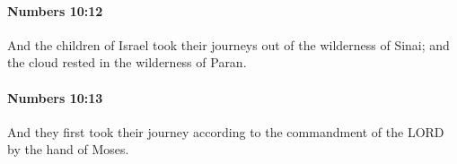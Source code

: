 		\paragraph{Numbers 10:12} %
			\label{NUMBERS-10-12}

			And the children of Israel took their journeys out of the wilderness of Sinai; and the cloud rested in the wilderness of Paran.


		\paragraph{Numbers 10:13} %
			\label{NUMBERS-10-13}

			And they first took their journey according to the commandment of the LORD by the hand of Moses.


